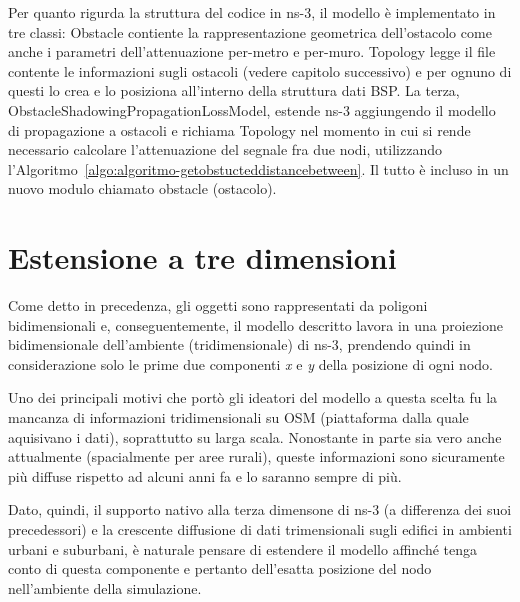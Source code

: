 %
Per quanto rigurda la struttura del codice in ns-3, il modello è implementato in tre classi:
\textsf{Obstacle} contiente la rappresentazione geometrica dell'ostacolo come anche i parametri dell'attenuazione per-metro e per-muro.
\textsf{Topology} legge il file contente le informazioni sugli ostacoli (vedere capitolo successivo) e per ognuno di questi
lo crea e lo posiziona all'interno della struttura dati BSP.
La terza, \textsf{ObstacleShadowingPropagationLossModel}, estende ns-3 aggiungendo il modello di propagazione a ostacoli
e richiama \textsf{Topology} nel momento in cui si rende necessario calcolare l'attenuazione del segnale fra due nodi,
utilizzando l'Algoritmo~\ref{algo:algoritmo-getobstucteddistancebetween}.
Il tutto è incluso in un nuovo modulo chiamato \textsf{obstacle} (ostacolo).
%
\section{Estensione a tre dimensioni}\label{sec:estensione-a-tre-dimensioni}
Come detto in precedenza, gli oggetti sono rappresentati da poligoni bidimensionali e, conseguentemente,
il modello descritto lavora in una proiezione bidimensionale dell'ambiente (tridimensionale) di ns-3,
prendendo quindi in considerazione solo le prime due componenti \textit{x} e \textit{y} della posizione di ogni nodo.

Uno dei principali motivi che portò gli ideatori del modello a questa scelta fu la mancanza di informazioni tridimensionali
su OSM (piattaforma dalla quale aquisivano i dati), soprattutto su larga scala.
Nonostante in parte sia vero anche attualmente (spacialmente per aree rurali), queste informazioni sono sicuramente
più diffuse rispetto ad alcuni anni fa e lo saranno sempre di più.

Dato, quindi, il supporto nativo alla terza dimensone di ns-3 (a differenza dei suoi precedessori) e la crescente diffusione
di dati trimensionali sugli edifici in ambienti urbani e suburbani, è naturale pensare di estendere il modello affinché
tenga conto di questa componente e pertanto dell'esatta posizione del nodo nell'ambiente della simulazione.
%

